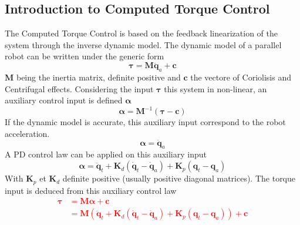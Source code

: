 \documentclass[a4paper]{article}
\newcommand{\mb}[1]{\mathbf{#1}}
\begin{document}
\subsection{Introduction to Computed Torque Control}
%
The Computed Torque Control is based on the feedback linearization of the system through the inverse dynamic model. The dynamic model of a parallel robot can be written under the generic form 
	\begin{equation*}
	\boldsymbol{\tau}=\mathbf{M}\ddot{\mathbf{q}}_a+\mathbf{c} \nonumber
	\end{equation*}
	$\mb{M}$ being the inertia matrix, definite positive and $\mathbf{c}$ the vectore of Coriolisis and Centrifugal effects.
	Considering the input $\boldsymbol{\tau}$ this system in non-linear, an auxiliary control input is defined  $\boldsymbol{\alpha}$
	\begin{equation*}
	\boldsymbol{\alpha}=\mathbf{M}^{-1}(\boldsymbol{\tau}-\mathbf{c})
	\end{equation*}
    If the dynamic model is accurate, this auxiliary input correspond to the robot acceleration.
	\begin{equation*}
	\boldsymbol{\alpha}=\ddot{\mathbf{q}}_a
	\end{equation*}
    A PD control law can be applied on this auxiliary input
	\begin{equation*}
	\boldsymbol{\alpha}=\ddot{\mathbf{q}}_{t}+\mathbf{K}_d(\dot{\mathbf{q}}_{t}-\dot{\mathbf{q}}_a)+\mathbf{K}_p(\mathbf{q}_{t}-\mathbf{q}_a)
	\end{equation*}
    With $\mathbf{K}_p$ et $\mathbf{K}_d$ definite positive (usually positive diagonal matrices). 
	The torque input is deduced from this auxiliary control law\textcolor{red}{
	\begin{align*}
\boldsymbol{\tau}&=\mathbf{M}\boldsymbol{\alpha}+\mathbf{c}\\
    &=\mathbf{M}(\ddot{\mathbf{q}}_{t}+\mathbf{K}_d(\dot{\mathbf{q}}_{t}-\dot{\mathbf{q}}_a)+\mathbf{K}_p(\mathbf{q}_{t}-\mathbf{q}_a))+\mathbf{c}	
	\end{align*}}
\end{document}
